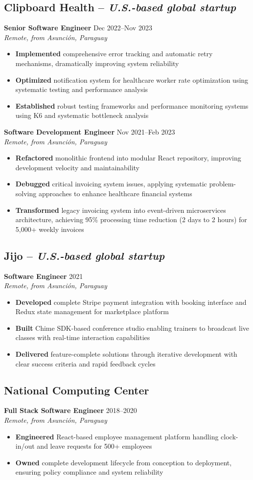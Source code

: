 \documentclass[11pt,a4paper]{article}
\newcommand{\actionverb}[1]{\textcolor{actioncolor}{\textbf{#1}}}
\newcommand{\cvcompany}[3]{
  \subsection{#1 \textcolor{mediumgray}{#2}}
  #3
  \vspace{0.5em}
}
\newcommand{\cvrole}[4]{
  \textbf{#1} \hfill \textcolor{mediumgray}{\small #2}\\
  \textit{#3}
  \begin{itemize}
    #4
  \end{itemize}
  \vspace{1em}
}
\begin{document}
\cvcompany{Clipboard Health}{-- \textit{U.S.-based global startup}}{
  \cvrole{Senior Software Engineer}{Dec 2022--Nov 2023}{Remote, from Asunción, Paraguay}{
    \item \actionverb{Implemented} comprehensive error tracking and automatic retry mechanisms, dramatically improving system reliability
    \item \actionverb{Optimized} notification system for healthcare worker rate optimization using systematic testing and performance analysis
    \item \actionverb{Established} robust testing frameworks and performance monitoring systems using K6 and systematic bottleneck analysis
  }
  
  \cvrole{Software Development Engineer}{Nov 2021--Feb 2023}{Remote, from Asunción, Paraguay}{
    \item \actionverb{Refactored} monolithic frontend into modular React repository, improving development velocity and maintainability
    \item \actionverb{Debugged} critical invoicing system issues, applying systematic problem-solving approaches to enhance healthcare financial systems
    \item \actionverb{Transformed} legacy invoicing system into event-driven microservices architecture, achieving 95\% processing time reduction (2 days to 2 hours) for 5,000+ weekly invoices
  }
}

\cvcompany{Jijo}{-- \textit{U.S.-based global startup}}{
  \cvrole{Software Engineer}{2021}{Remote, from Asunción, Paraguay}{
    \item \actionverb{Developed} complete Stripe payment integration with booking interface and Redux state management for marketplace platform
    \item \actionverb{Built} Chime SDK-based conference studio enabling trainers to broadcast live classes with real-time interaction capabilities
    \item \actionverb{Delivered} feature-complete solutions through iterative development with clear success criteria and rapid feedback cycles
  }
}

\cvcompany{National Computing Center}{}{
  \cvrole{Full Stack Software Engineer}{2018--2020}{Remote, from Asunción, Paraguay}{
    \item \actionverb{Engineered} React-based employee management platform handling clock-in/out and leave requests for 500+ employees
    \item \actionverb{Owned} complete development lifecycle from conception to deployment, ensuring policy compliance and system reliability
  }
}
\end{document}
